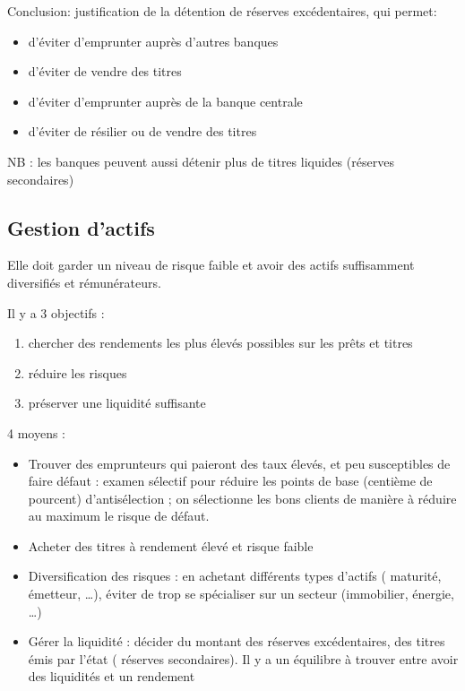 	Conclusion: justification de la détention de 
réserves excédentaires, qui permet: 
	\begin{itemize}
		\item d'éviter d'emprunter auprès d'autres banques 
		\item d'éviter de vendre des titres 
		\item d'éviter d'emprunter auprès de la banque centrale 
		\item d'éviter de résilier ou de vendre des titres 
	\end{itemize}
	
	NB : les banques peuvent aussi détenir plus de titres liquides (réserves secondaires) 
	
	\subsection{Gestion d'actifs}
	
	Elle doit garder un niveau de risque faible et avoir des actifs suffisamment diversifiés et rémunérateurs.
	
	Il y a 3 objectifs :
	
	\begin{enumerate}
		\item chercher des rendements les plus élevés possibles sur les prêts et titres 
		\item réduire les risques 
		\item préserver une liquidité suffisante
	\end{enumerate}
	
	4 moyens :
	
	\begin{itemize}
		\item Trouver des emprunteurs qui paieront des taux élevés, et peu susceptibles de faire défaut : examen sélectif pour réduire les points de base (centième de pourcent) d'antisélection ; on sélectionne les bons clients de manière à réduire au maximum le risque de défaut.
		\item Acheter des titres à rendement élevé et risque faible
		\item Diversification des risques : en achetant différents types d'actifs ( maturité, émetteur, \dots), éviter de trop se spécialiser sur un secteur (immobilier, énergie, \dots) 
		\item Gérer la liquidité : décider du montant des réserves excédentaires, des titres émis par l'état ( réserves secondaires). Il y a un équilibre à trouver entre avoir des liquidités et un rendement
	\end{itemize}
	
